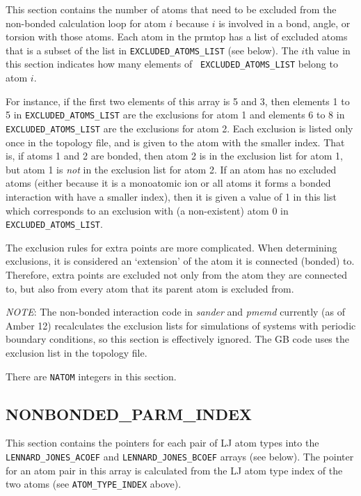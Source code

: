 This section contains the number of atoms that need to be excluded from the
non-bonded calculation loop for atom $i$ because $i$ is involved in a bond,
angle, or torsion with those atoms. Each atom in the prmtop has a list of
excluded atoms that is a subset of the list in {\tt EXCLUDED\_ATOMS\_LIST} (see
below). The $i$th value in this section indicates how many elements of {\tt
EXCLUDED\_ATOMS\_LIST} belong to atom $i$.

For instance, if the first two elements of this array is 5 and 3, then elements
1 to 5 in {\tt EXCLUDED\_ATOMS\_LIST} are the exclusions for atom 1 and elements
6 to 8 in {\tt EXCLUDED\_ATOMS\_LIST} are the exclusions for atom 2. Each
exclusion is listed only once in the topology file, and is given to the atom
with the smaller index. That is, if atoms 1 and 2 are bonded, then atom 2 is in
the exclusion list for atom 1, but atom 1 is \emph{not} in the exclusion list
for atom 2. If an atom has no excluded atoms (either because it is a monoatomic
ion or all atoms it forms a bonded interaction with have a smaller index), then
it is given a value of 1 in this list which corresponds to an exclusion with (a
non-existent) atom 0 in {\tt EXCLUDED\_ATOMS\_LIST}.

The exclusion rules for extra points are more complicated. When determining
exclusions, it is considered an `extension' of the atom it is connected (bonded)
to. Therefore, extra points are excluded not only from the atom they are
connected to, but also from every atom that its parent atom is excluded from.

\emph{NOTE}: The non-bonded interaction code in \emph{sander} and \emph{pmemd}
currently (as of Amber 12) recalculates the exclusion lists for simulations of
systems with periodic boundary conditions, so this section is effectively
ignored. The GB code uses the exclusion list in the topology file.


\noindent There are {\tt NATOM} integers in this section.

\subsection*{NONBONDED\_PARM\_INDEX}

\sloppy
This section contains the pointers for each pair of LJ atom types into the {\tt
LENNARD\_JONES\_ACOEF} and {\tt LENNARD\_JONES\_BCOEF} arrays (see below). The
pointer for an atom pair in this array is calculated from the LJ atom type index
of the two atoms (see {\tt ATOM\_TYPE\_INDEX} above).

